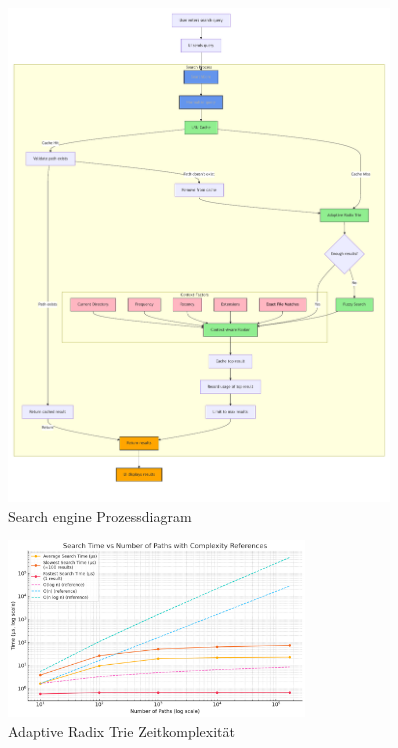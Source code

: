 \begin{figure}[p]
  \centering
  \includegraphics[width=0.9\textwidth]{./search_engine_images/diagram.pdf}
  \caption{Search engine Prozessdiagram}
  \label{fig:searchEngine}
\end{figure}

\begin{figure}[htbp]
  \centering
  \includegraphics[width=0.7\textwidth]{./search_engine_images/art.png}
  \caption{Adaptive Radix Trie Zeitkomplexität}
  \label{fig:ART_time_complexity}
\end{figure}

